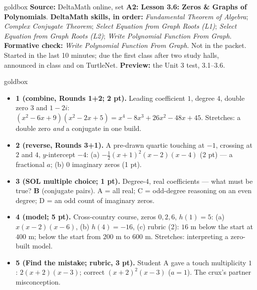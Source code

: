 \documentclass[10pt]{article}
\begin{document}
\boxguard
\begin{skillbox}{goldbox}
\textbf{Source:} DeltaMath online, set \textbf{A2: Lesson 3.6: Zeros \& Graphs of Polynomials}. \textbf{DeltaMath skills, in order:} \emph{Fundamental Theorem of Algebra}; \emph{Complex Conjugate Theorem}; \emph{Select Equation from Graph Roots (L1)}; \emph{Select Equation from Graph Roots (L2)}; \emph{Write Polynomial Function From Graph}. \textbf{Formative check:} \emph{Write Polynomial Function From Graph}.
Not in the packet. Started in the last 10 minutes; due the first class after two study halls,
announced in class and on TurtleNet. \textbf{Preview:} the Unit 3 test, 3.1--3.6.
\end{skillbox}

\boxguard
\begin{skillbox}{goldbox}
\begin{itemize}[leftmargin=1.2em, nosep]
  \item \textbf{1 (combine, Rounds 1+2; 2 pt).} Leading coefficient $1$, degree $4$, double zero
        $3$ and $1-2i$: $(x^2-6x+9)(x^2-2x+5)=x^4-8x^3+26x^2-48x+45$. Stretches: a double zero
        \emph{and} a conjugate in one build.
  \item \textbf{2 (reverse, Rounds 3+1).} A pre-drawn quartic touching at $-1$, crossing at $2$
        and $4$, $y$-intercept $-4$: (a) $-\tfrac12(x+1)^2(x-2)(x-4)$ (2 pt) --- a fractional
        $a$; (b) $0$ imaginary zeros (1 pt).
  \item \textbf{3 (SOL multiple choice; 1 pt).} Degree-4, real coefficients --- what must be
        true? \textbf{B} (conjugate pairs). A = all real; C = odd-degree reasoning on an even
        degree; D = an odd count of imaginary zeros.
  \item \textbf{4 (model; 5 pt).} Cross-country course, zeros $0,2,6$, $h(1)=5$: (a)
        $x(x-2)(x-6)$, (b) $h(4)=-16$, (c) rubric (2): $16$ m below the start at $400$ m; below
        the start from $200$ m to $600$ m. Stretches: interpreting a zero-built model.
  \item \textbf{5 (Find the mistake; rubric, 3 pt).} Student A gave a touch multiplicity $1$:
        $2(x+2)(x-3)$; correct $(x+2)^2(x-3)$ ($a=1$). The crux's partner misconception.
\end{itemize}
\end{skillbox}
\end{document}

